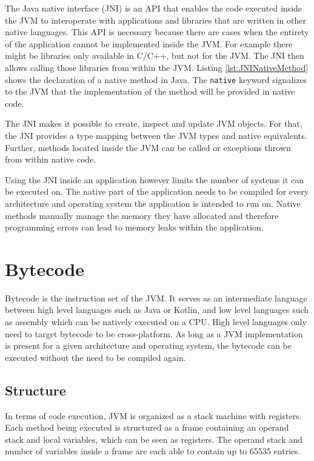 The Java native interface (JNI) is an API that enables the code executed inside the JVM to interoperate with applications and libraries that are written in other native languages. This API is necessary because there are cases when the entirety of the application cannot be implemented inside the JVM. For example there might be libraries only available in C/C++, but not for the JVM. The JNI then allows calling those libraries from within the JVM. Listing \ref{lst:JNINativeMethod} shows the declaration of a native method in Java. The \texttt{native} keyword signalizes to the JVM that the implementation of the method will be provided in native code.


The JNI makes it possible to create, inspect and update JVM objects. For that, the JNI provides a type mapping between the JVM types and native equivalents. Further, methods located inside the JVM can be called or exceptions thrown from within native code.

Using the JNI inside an application however limits the number of systems it can be executed on. The native part of the application needs to be compiled for every architecture and operating system the application is intended to run on. Native methods manually manage the memory they have allocated and therefore programming errors can lead to memory leaks within the application.  

\section{Bytecode}

Bytecode is the instruction set of the JVM. It serves as an intermediate language between high level languages such as Java or Kotlin, and low level languages such as assembly which can be natively executed on a CPU. High level languages only need to target bytecode to be cross-platform. As long as a JVM implementation is present for a given architecture and operating system, the bytecode can be executed without the need to be compiled again. 

\subsection{Structure}

In terms of code execution, JVM is organized as a stack machine with registers. Each method being executed is structured as a frame containing an operand stack and local variables, which can be seen as registers. The operand stack and number of variables inside a frame are each able to contain up to 65535 entries.

